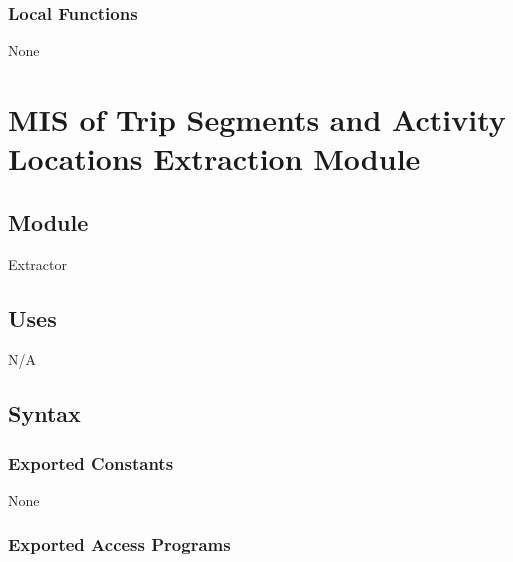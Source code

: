 \documentclass[12pt, titlepage]{article}
\begin{document}
\subsubsection{Local Functions}

None
  
\newpage

\section{MIS of Trip Segments and Activity Locations Extraction Module} \label{Extractor} 
\subsection{Module}

Extractor

\subsection{Uses}
N/A

\subsection{Syntax}

\subsubsection{Exported Constants}
None

\subsubsection{Exported Access Programs}
\end{document}
